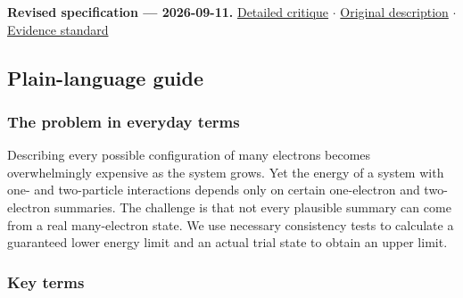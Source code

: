 \documentclass[
  11pt,
]{article}
\begin{document}
\textbf{Revised specification --- 2026-09-11.}
\href{https://github.com/rick-stevens-ai/Pure-Thought/blob/main/reviews/16-N-Representability-2RDM.md}{Detailed
critique} \ensuremath{\cdot}
\href{https://github.com/rick-stevens-ai/Pure-Thought/blob/main/archive/original-PRDs/16-N-Representability-2RDM.md}{Original
description} \ensuremath{\cdot}
\href{https://github.com/rick-stevens-ai/Pure-Thought/blob/main/reviews/EVIDENCE-STANDARD.md}{Evidence
standard}

\subsection{Plain-language guide}

\subsubsection{The problem in everyday terms}

Describing every possible configuration of many electrons becomes
overwhelmingly expensive as the system grows. Yet the energy of a system
with one- and two-particle interactions depends only on certain
one-electron and two-electron summaries. The challenge is that not every
plausible summary can come from a real many-electron state. We use
necessary consistency tests to calculate a guaranteed lower energy limit
and an actual trial state to obtain an upper limit.

\subsubsection{Key terms}
\end{document}
